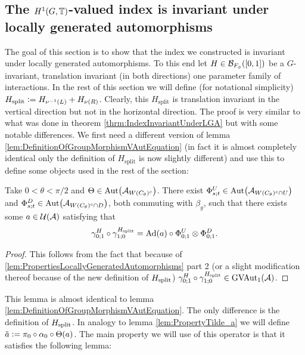 \documentclass[12pt,a4paper,twoside]{article}
\numberwithin{equation}{section}
\begin{document}
\subsection{The $H^1(G,\TT)$-valued index is invariant under locally generated automorphisms}\label{sec:H^1IndexInvariantUnderRotations}
The goal of this section is to show that the index we constructed is invariant under locally generated automorphisms. To this end let $H\in \BB_{F_\phi}([0,1])$ be a $G$-invariant, translation invariant (in both directions) one parameter family of interactions. In the rest of this section we will define (for notational simplicity) $H_{\text{split}}\defeq H_{\nu^{-1}(L)}+H_{\nu(R)}$. Clearly, this $H_{\text{split}}$ is translation invariant in the vertical direction but not in the horizontal direction. The proof is very similar to what was done in theorem \ref{thrm:IndexInvariantUnderLGA} but with some notable differences. We first need a different version of lemma \ref{lem:DefinitionOfGroupMorphismVAutEquation} (in fact it is almost completely identical only the definition of $H_{\text{split}}$ is now slightly different) and use this to define some objects used in the rest of the section:
\begin{lemma}\label{lem:DefinitionOfGroupMorphismVAutEquationTwoTranslations}
	Take $0<\theta<\pi/2$ and $\Theta\in \Aut{\AA_{W(C_\theta)^c}}$. There exist $\Phi^U_{s;t}\in\Aut{\AA_{W(C_\theta)^c\cap U}}$ and $\Phi^D_{s;t}\in\Aut{\AA_{W(C_\theta)^c\cap D}}$, both commuting with $\beta_g$, such that there exists some $a\in\UU(\AA)$ satisfying that
	\begin{equation}\label{eq:DefinitionOfGroupMorphismVAutEquationTwoTranslations}
	\gamma^H_{0;1}\circ\gamma^{H_\text{split}}_{1;0}=\Ad{a}\circ \Phi^U_{0;1}\otimes\Phi^D_{0;1}.
	\end{equation}
\end{lemma}
\begin{proof}
	This follows from the fact that because of \ref{lem:PropertiesLocallyGeneratedAutomorphisms} part 2 (or a slight modification thereof because of the new definition of $\Hsplit$) $\gamma^H_{0;1}\circ\gamma^{H_\text{split}}_{1;0}\in \textrm{GVAut}_1(\AA)$.
\end{proof}
This lemma is almost identical to lemma \ref{lem:DefinitionOfGroupMorphismVAutEquation}. The only difference is the definition of $\Hsplit$. In analogy to lemma \ref{lem:PropertyTilde_a} we will define $\tilde{a}\defeq \pi_0\circ\alpha_0\circ\Theta(a)$. The main property we will use of this operator is that it satisfies the following lemma:
\end{document}
